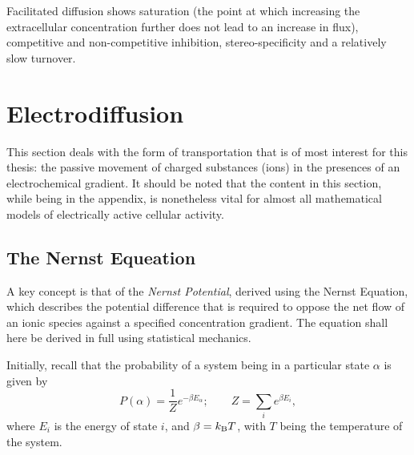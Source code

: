 \documentclass[../thesis-main.tex]{subfiles}
\begin{document}
 Facilitated diffusion shows saturation (the point at which increasing the extracellular concentration further does not lead to an increase in flux), competitive and non-competitive inhibition, stereo-specificity and a relatively slow turnover.
 
 \section{Electrodiffusion}
 \label{sec:electrodiffusion}
 This section deals with the form of transportation that is of most interest for this thesis: the passive movement of charged substances (ions) in the presences of an electrochemical gradient. It should be noted that the content in this section, while being in the appendix, is nonetheless vital for almost all mathematical models of electrically active cellular activity.
 
 \subsection{The Nernst Equeation}
 \label{subsec:nernst}
 A key concept is that of the \emph{Nernst Potential}, derived using the Nernst Equation, which describes the potential difference that is required to oppose the net flow of an ionic species against a specified concentration gradient. The equation shall here be derived in full using statistical mechanics.
 
 Initially, recall that the probability of a system being in a particular state $\alpha$ is given by
 \begin{equation}
  P(\alpha) = \frac{1}{Z}e^{-\beta E_\alpha}; \qquad Z = \sum_i e^{\beta E_i},
 \end{equation}
 where $E_i$ is the energy of state $i$, and $\beta = k_\textnormal{B}T$, with $T$ being the temperature of the system.
 
\end{document}

